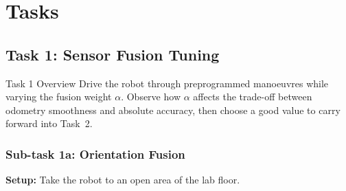 \documentclass[12pt,letterpaper]{article}
\begin{document}
\newpage

\section{Tasks}



\subsection{Task 1: Sensor Fusion Tuning}

\begin{taskbox}{Task 1 Overview}
  Drive the robot through preprogrammed manoeuvres while varying the
  fusion weight $\alpha$.  Observe how $\alpha$ affects the trade-off between
  odometry smoothness and absolute accuracy, then choose a good value to carry
  forward into Task~2.
\end{taskbox}

\subsubsection{Sub-task 1a: Orientation Fusion}

\textbf{Setup:} Take the robot to an open area of the lab floor.
\end{document}
